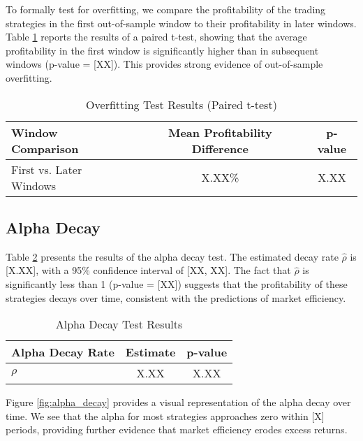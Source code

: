 To formally test for overfitting, we compare the profitability of the trading strategies in the first out-of-sample window to their profitability in later windows. Table \ref{tab:overfitting_test} reports the results of a paired t-test, showing that the average profitability in the first window is significantly higher than in subsequent windows (p-value = [XX]). This provides strong evidence of out-of-sample overfitting.

\begin{table}[H]
    \centering
    \caption{Overfitting Test Results (Paired t-test)}
    \label{tab:overfitting_test}
    \begin{tabular}{lcc}
        \hline
        \textbf{Window Comparison} & \textbf{Mean Profitability Difference} & \textbf{p-value} \\
        \hline
        First vs. Later Windows & X.XX\% & X.XX \\
        \hline
    \end{tabular}
\end{table}

\subsection{Alpha Decay}

Table \ref{tab:alpha_decay} presents the results of the alpha decay test. The estimated decay rate $\hat{\rho}$ is [X.XX], with a 95\% confidence interval of [XX, XX]. The fact that $\hat{\rho}$ is significantly less than 1 (p-value = [XX]) suggests that the profitability of these strategies decays over time, consistent with the predictions of market efficiency.

\begin{table}[H]
    \centering
    \caption{Alpha Decay Test Results}
    \label{tab:alpha_decay}
    \begin{tabular}{lcc}
        \hline
        \textbf{Alpha Decay Rate} & \textbf{Estimate} & \textbf{p-value} \\
        \hline
        $\rho$ & X.XX & X.XX \\
        \hline
    \end{tabular}
\end{table}

Figure \ref{fig:alpha_decay} provides a visual representation of the alpha decay over time. We see that the alpha for most strategies approaches zero within [X] periods, providing further evidence that market efficiency erodes excess returns.

